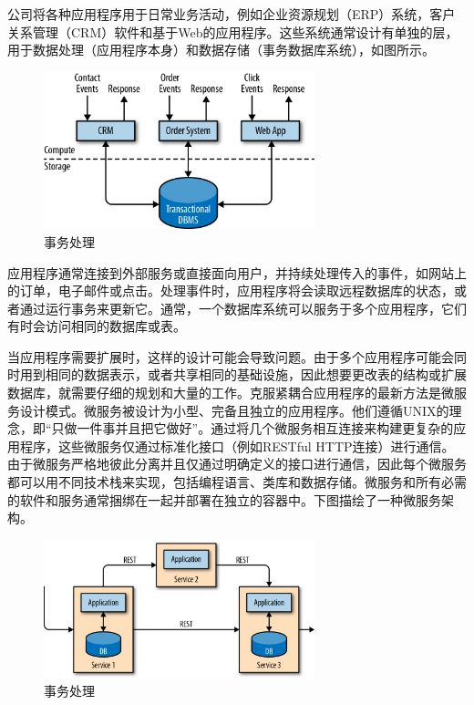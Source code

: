 \documentclass[cn,11pt,chinese]{elegantbook}
\begin{document}
公司将各种应用程序用于日常业务活动，例如企业资源规划（ERP）系统，客户关系管理（CRM）软件和基于Web的应用程序。这些系统通常设计有单独的层，用于数据处理（应用程序本身）和数据存储（事务数据库系统），如图所示。

\begin{figure}[htbp]
  \centering
  \includegraphics[width=0.7\textwidth]{images/spaf_0101.png}
  \caption{事务处理}
\end{figure}

应用程序通常连接到外部服务或直接面向用户，并持续处理传入的事件，如网站上的订单，电子邮件或点击。处理事件时，应用程序将会读取远程数据库的状态，或者通过运行事务来更新它。通常，一个数据库系统可以服务于多个应用程序，它们有时会访问相同的数据库或表。

当应用程序需要扩展时，这样的设计可能会导致问题。由于多个应用程序可能会同时用到相同的数据表示，或者共享相同的基础设施，因此想要更改表的结构或扩展数据库，就需要仔细的规划和大量的工作。克服紧耦合应用程序的最新方法是微服务设计模式。微服务被设计为小型、完备且独立的应用程序。他们遵循UNIX的理念，即“只做一件事并且把它做好”。通过将几个微服务相互连接来构建更复杂的应用程序，这些微服务仅通过标准化接口（例如RESTful HTTP连接）进行通信。由于微服务严格地彼此分离并且仅通过明确定义的接口进行通信，因此每个微服务都可以用不同技术栈来实现，包括编程语言、类库和数据存储。微服务和所有必需的软件和服务通常捆绑在一起并部署在独立的容器中。下图描绘了一种微服务架构。

\begin{figure}[htbp]
  \centering
  \includegraphics[width=0.7\textwidth]{images/spaf_0102.png}
  \caption{事务处理}
\end{figure}
\end{document}
